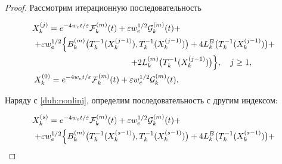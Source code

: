 \smallskip



\begin{proof} Рассмотрим итерационную последовательность 

\begin{gather*}

X^{(j)}_k=e^{-4w_e t/ \varepsilon} {\cal F}^{(m)}_k(t)

+\varepsilon w_e^{1/2} {\cal G}^{(m)}_k(t)+ \hspace{4cm} \;

\\

+\varepsilon w_e^{1/2}\Bigl\{ B^{(m)}_k \bigl(T^{-1}_k(X^{(j-1)}_k), 

T^{-1}_k(X^{(j-1)}_k)\bigr)


+4 L_k^B \bigl(T^{-1}_k(X^{(j-1)}_k)\bigr)+

\\

\;

\hspace{3cm}

+2L^{(m)}_k \bigl(T^{-1}_k(X^{(j-1)}_k)\bigr)\Bigr\}, \quad j\ge1,

\\

X^{(0)}_k=e^{-4w_e t/ \varepsilon} {\cal F}^{(m)}_k(t)

+\varepsilon w_e^{1/2}{\cal G}^{(m)}_k(t). \hspace{4cm} \;

\end{gather*}

Наряду с \eqref{duh:nonlinj}, определим последовательность с другим индексом:

\begin{gather*}

X^{(s)}_k=e^{-4w_e t/ \varepsilon} {\cal F}^{(m)}_k(t)

+\varepsilon w_e^{1/2} {\cal G}^{(m)}_k(t)+  \hspace{4cm} \;

\\

+\varepsilon w_e^{1/2}\Bigl\{ B^{(m)}_k \bigl(T^{-1}_k(X^{(s-1)}_k), 

T^{-1}_k(X^{(s-1)}_k)\bigr)

\label{nonlin,j}

+4 L_k^B \bigl(T^{-1}_k(X^{(s-1)}_k)\bigr)+

\\


\end{gather*}
\end{proof}
